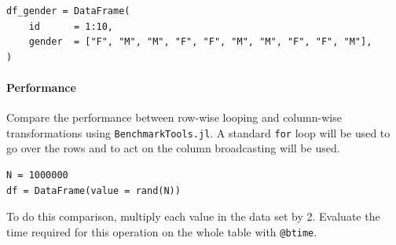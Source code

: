 \documentclass{article}
\begin{document}
\begin{verbatim}
df_gender = DataFrame(
    id      = 1:10,
    gender  = ["F", "M", "M", "F", "F", "M", "M", "F", "F", "M"],
)
\end{verbatim}

\paragraph{Performance}

\medskip
\noindent
Compare the performance between row-wise looping and column-wise transformations using \texttt{BenchmarkTools.jl}. A standard \texttt{for} loop will be used to go over the rows and to act on the column broadcasting will be used.

\begin{verbatim}
N = 1000000
df = DataFrame(value = rand(N))
\end{verbatim}

\medskip
\noindent
To do this comparison, multiply each value in the data set by 2. Evaluate the time required for this operation on the whole table with \texttt{@btime}. 
\end{document}
